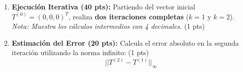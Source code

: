 \documentclass[12pt, letterpaper]{article}
\begin{document}
\begin{enumerate}
\begin{enumerate}
    \item \textbf{Ejecución Iterativa (40 pts):} 
    Partiendo del vector inicial $T^{(0)} = (0, 0, 0)^T$, realiza \textbf{dos iteraciones completas} ($k=1$ y $k=2$). \textit{Nota: Muestra los cálculos intermedios con 4 decimales.} (1 pts) 
    
    \item \textbf{Estimación del Error (20 pts):} 
    Calcula el error absoluto en la segunda iteración utilizando la norma infinito: (1 pts)
    \[ ||T^{(2)} - T^{(1)}||_\infty \]
\end{enumerate}

\end{enumerate}
\end{document}
